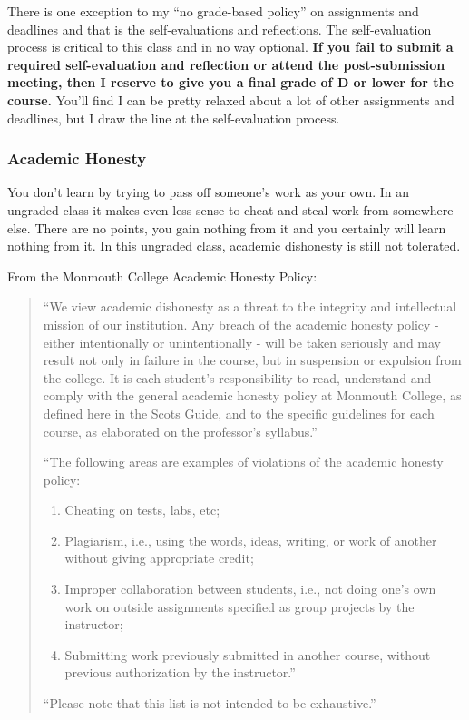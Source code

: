 \documentclass[10pt]{article}
\begin{document}
There is one exception to my ``no grade-based policy'' on assignments and deadlines and that is the self-evaluations and reflections. The self-evaluation process is critical to this class and in no way optional. \textbf{If you fail to submit a required self-evaluation and reflection or attend the post-submission meeting, then I reserve to give you a final grade of D or lower for the course.} You'll find I can be pretty relaxed about a lot of other assignments and deadlines, but I draw the line at the self-evaluation process.


\subsubsection*{Academic Honesty}

You don't learn by trying to pass off someone's work as your own. In an ungraded class it makes even less sense to cheat and steal work from somewhere else.  There are no points, you gain nothing from it and you certainly will learn nothing from it. In this ungraded class, academic dishonesty is still not tolerated.

From the Monmouth College Academic Honesty Policy:
\begin{quote}
  ``We view academic dishonesty as a threat to the integrity and intellectual mission of our institution. Any breach of the academic honesty policy - either intentionally or unintentionally - will be taken seriously and may result not only in failure in the course, but in suspension or expulsion from the college. It is each student’s responsibility to read, understand and comply with the general academic honesty policy at Monmouth College, as defined here in the Scots Guide, and to the specific guidelines for each course, as elaborated on the professor’s syllabus.''

  ``The following areas are examples of violations of the academic honesty policy:
  \begin{enumerate}
  \item Cheating on tests, labs, etc;
  \item Plagiarism, i.e., using the words, ideas, writing, or work of another without giving appropriate credit;
  \item Improper collaboration between students, i.e., not doing one’s own work on outside assignments specified as group projects by the instructor;
  \item Submitting work previously submitted in another course, without previous authorization by the instructor.''
  \end{enumerate}

  ``Please note that this list is not intended to be exhaustive.''
\end{quote}
\end{document}
